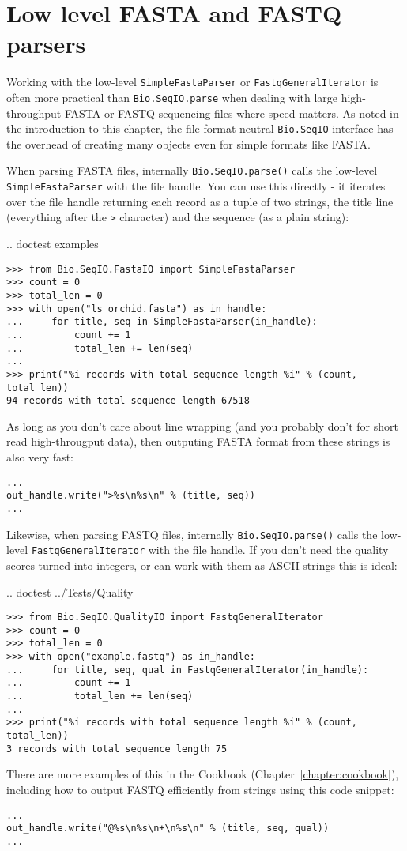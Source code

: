 \section{Low level FASTA and FASTQ parsers}
\label{sec:low-level-fasta-fastq}

Working with the low-level \verb|SimpleFastaParser| or
\verb|FastqGeneralIterator| is often more practical than
\verb|Bio.SeqIO.parse| when dealing with large high-throughput FASTA
or FASTQ sequencing files where speed matters.
As noted in the introduction to this chapter, the file-format neutral
\verb|Bio.SeqIO| interface has the overhead of creating many objects
even for simple formats like FASTA.

When parsing FASTA files, internally \verb|Bio.SeqIO.parse()| calls
the low-level \verb|SimpleFastaParser| with the file handle.
You can use this directly - it iterates over the file handle returning
each record as a tuple of two strings, the title line (everything after
the \verb|>| character) and the sequence (as a plain string):

\pandocignoreme .. doctest examples
\begin{verbatim}
>>> from Bio.SeqIO.FastaIO import SimpleFastaParser
>>> count = 0
>>> total_len = 0
>>> with open("ls_orchid.fasta") as in_handle:
...     for title, seq in SimpleFastaParser(in_handle):
...         count += 1
...         total_len += len(seq)
...
>>> print("%i records with total sequence length %i" % (count, total_len))
94 records with total sequence length 67518
\end{verbatim}

As long as you don't care about line wrapping (and you probably don't
for short read high-througput data), then outputing FASTA format from
these strings is also very fast:

\begin{verbatim}
...
out_handle.write(">%s\n%s\n" % (title, seq))
...
\end{verbatim}

Likewise, when parsing FASTQ files, internally \verb|Bio.SeqIO.parse()|
calls the low-level \verb|FastqGeneralIterator| with the file handle.
If you don't need the quality scores turned into integers,
or can work with them as ASCII strings this is ideal:

\pandocignoreme .. doctest ../Tests/Quality
\begin{verbatim}
>>> from Bio.SeqIO.QualityIO import FastqGeneralIterator
>>> count = 0
>>> total_len = 0
>>> with open("example.fastq") as in_handle:
...     for title, seq, qual in FastqGeneralIterator(in_handle):
...         count += 1
...         total_len += len(seq)
...
>>> print("%i records with total sequence length %i" % (count, total_len))
3 records with total sequence length 75
\end{verbatim}

There are more examples of this in the Cookbook (Chapter~\ref{chapter:cookbook}),
including how to output FASTQ efficiently from strings using this code snippet:

\begin{verbatim}
...
out_handle.write("@%s\n%s\n+\n%s\n" % (title, seq, qual))
...
\end{verbatim}
